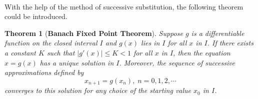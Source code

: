 \documentclass{article}
\newtheorem{theorem}{Theorem}[section]
\theoremstyle{definition}
\theoremstyle{remark}
\begin{document}
\paragraph{  }

With the help of the method of successive substitution, the following theorem could be introduced.

\begin{theorem}[\textbf{Banach Fixed Point Theorem}]\label{thm:BFPT}
Suppose $g$ is a differentiable function on the closed interval $I$ and $g(x)$ lies in $I$ for all $x$ in $I$. If there exists a constant $K$ such that $\lvert g'(x) \rvert \leq K < 1$ for all $x$ in $I$, then the equation $x = g(x)$ has a unique solution in $I$. Moreover, the sequence of successive approximations defined by 
\begin{equation}\label{eqn:BFPT_sa}
    x_{n+1} = g(x_n), \; n = 0, 1, 2, \cdots
\end{equation}
converges to this solution for any choice of the starting value $x_0$ in $I$.
\end{theorem}
\end{document}
